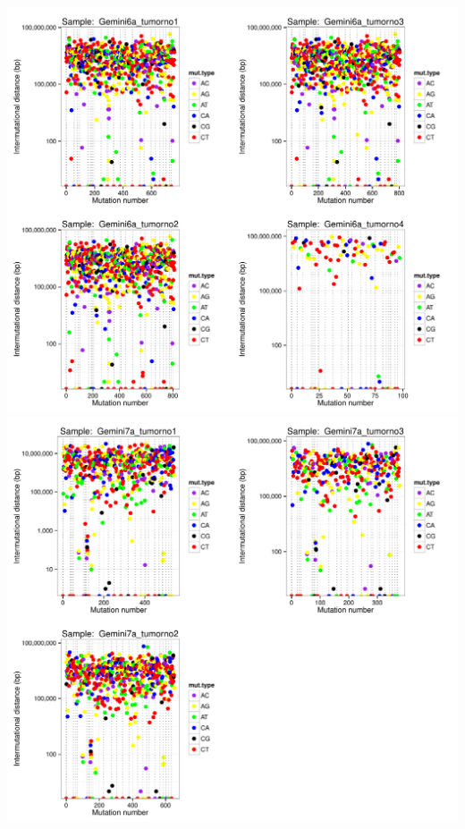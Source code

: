 \documentclass[a4paper,11pt]{article}
\begin{document}
\includegraphics{CLLpilot_rainfallplots_pub-004}
\\
\includegraphics{CLLpilot_rainfallplots_pub-005}
\\
\end{document}
